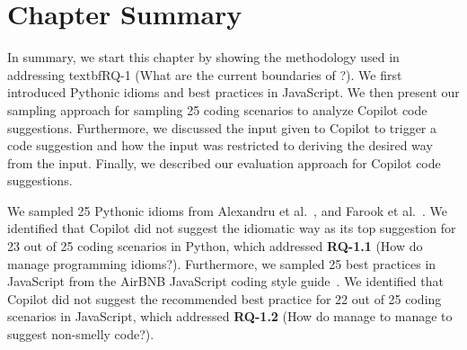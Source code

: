 \section{Chapter Summary}
In summary, we start this chapter by showing the methodology used in addressing textbf{RQ-1} (What are the current boundaries of \cct{}?). 
We first introduced Pythonic idioms and best practices in JavaScript.
We then present our sampling approach for sampling 25 coding scenarios to analyze Copilot code suggestions.
Furthermore, we discussed the input given to Copilot to trigger a code suggestion 
and how the input was restricted to deriving the desired way from the input.
Finally, we described our evaluation approach for Copilot code suggestions.

We sampled 25 Pythonic idioms from Alexandru et al.~\cite{Alexandru2018}, and Farook et al.~\cite{idioms}.
We identified that Copilot did not suggest the idiomatic way as its top suggestion for 23 out of 25 coding scenarios in Python, which addressed \textbf{RQ-1.1} (How do \cct{} manage programming idioms?).
Furthermore, we sampled 25 best practices in JavaScript from the AirBNB JavaScript coding style guide~\cite{airbnb_code}. We identified that Copilot did not suggest the recommended best practice for 22 out of 25 coding scenarios in JavaScript, which addressed \textbf{RQ-1.2} (How do \cct{} manage to manage to suggest non-smelly code?).




